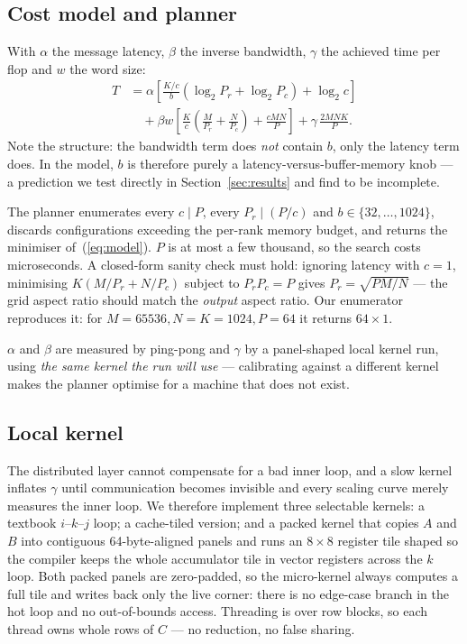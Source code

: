 \documentclass[conference,10pt]{IEEEtran}
\begin{document}
\subsection{Cost model and planner}

With $\alpha$ the message latency, $\beta$ the inverse bandwidth, $\gamma$ the
achieved time per flop and $w$ the word size:
\begin{align}
T &= \alpha\!\left[\tfrac{K/c}{b}(\log_2 P_r + \log_2 P_c) + \log_2 c\right]
  \nonumber\\
  &\quad + \beta w\!\left[\tfrac{K}{c}\!\left(\tfrac{M}{P_r} + \tfrac{N}{P_c}\right)
      + \tfrac{cMN}{P}\right]
   + \gamma\,\tfrac{2MNK}{P}. \label{eq:model}
\end{align}
Note the structure: the bandwidth term does \emph{not} contain $b$, only the
latency term does. In the model, $b$ is therefore purely a
latency-versus-buffer-memory knob --- a prediction we test directly in
Section~\ref{sec:results} and find to be incomplete.

The planner enumerates every $c \mid P$, every $P_r \mid (P/c)$ and
$b \in \{32,\dots,1024\}$, discards configurations exceeding the per-rank memory
budget, and returns the minimiser of~(\ref{eq:model}). $P$ is at most a few
thousand, so the search costs microseconds. A closed-form sanity check must
hold: ignoring latency with $c=1$, minimising $K(M/P_r + N/P_c)$ subject to
$P_rP_c=P$ gives $P_r = \sqrt{PM/N}$ --- the grid aspect ratio should match the
\emph{output} aspect ratio. Our enumerator reproduces it: for
$M{=}65536, N{=}K{=}1024, P{=}64$ it returns $64\times1$.

$\alpha$ and $\beta$ are measured by ping-pong and $\gamma$ by a
panel-shaped local kernel run, using \emph{the same kernel the run will use} ---
calibrating against a different kernel makes the planner optimise for a machine
that does not exist.

\subsection{Local kernel}

The distributed layer cannot compensate for a bad inner loop, and a slow kernel
inflates $\gamma$ until communication becomes invisible and every scaling curve
merely measures the inner loop. We therefore implement three selectable
kernels: a textbook $i$--$k$--$j$ loop; a cache-tiled version; and a packed
kernel that copies $A$ and $B$ into contiguous 64-byte-aligned panels and runs
an $8\times8$ register tile shaped so the compiler keeps the whole accumulator
tile in vector registers across the $k$ loop. Both packed panels are
zero-padded, so the micro-kernel always computes a full tile and writes back
only the live corner: there is no edge-case branch in the hot loop and no
out-of-bounds access. Threading is over row blocks, so each thread owns whole
rows of $C$ --- no reduction, no false sharing.
\end{document}
